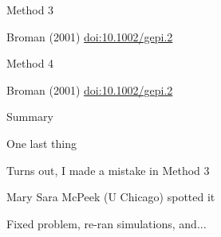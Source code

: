 \documentclass[aspectratio=169,12pt,t]{beamer}
\begin{document}
\begin{frame}{Method 3}

\vspace{18mm}

\hfill \footnotesize {\lolit Broman (2001)
  \href{https://doi.org/10.1002/gepi.2}{doi:10.1002/gepi.2}}


\note{
}

\end{frame}

\begin{frame}{Method 4}

\bigskip

\hfill \footnotesize {\lolit Broman (2001)
  \href{https://doi.org/10.1002/gepi.2}{doi:10.1002/gepi.2}}


\note{
}

\end{frame}


\begin{frame}[c]{Summary}

\note{
}

\end{frame}


\begin{frame}{One last thing}

  \bbi
\item Turns out, I made a {\hilit mistake} in Method 3
  \bi
\item[]  Mary Sara McPeek (U Chicago) spotted it
  \ei
\item Fixed problem, re-ran simulations, and... \\[18pt]
 \ei


\note{
}

\end{frame}
\end{document}
